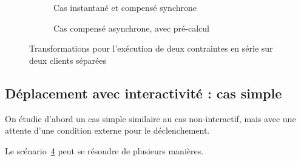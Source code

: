 \documentclass[10pt]{article}
\begin{document}
\begin{figure}[h]
\centering
\begin{subfigure}{.5\linewidth}
\begin{tikzpicture}

\end{tikzpicture}
\caption{Cas instantané et compensé synchrone}
\label{depl.simple.async.instant}
\end{subfigure}

\begin{subfigure}{.5\linewidth}
    \begin{tikzpicture}
    
    \end{tikzpicture}
    \caption{Cas compensé asynchrone, avec pré-calcul}
    \label{depl.simple.sync.comp}
\end{subfigure}
\caption{Transformations pour l'exécution de deux contraintes en série sur deux clients séparées}
\label{scenar.deplacement}
\end{figure}





\subsection{Déplacement avec interactivité : cas simple}
On étudie d'abord un cas simple similaire au cas non-interactif, mais avec une attente d'une condition externe pour le déclenchement.

\begin{figure}[h]
	\centering
	\begin{tikzpicture}
	
	\end{tikzpicture}
	\label{scenar.trigger-1}
\end{figure}

Le scénario~\ref{scenar.trigger-1} peut se résoudre de plusieurs manières.
\end{document}
